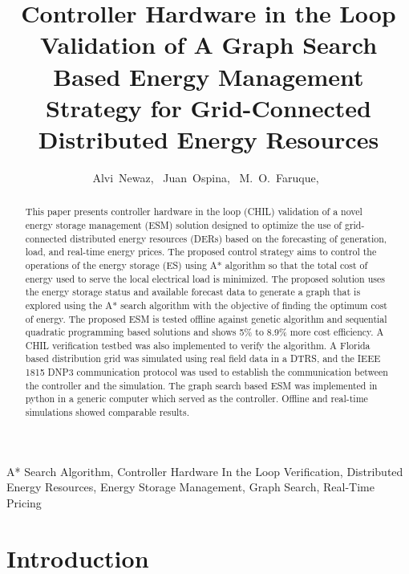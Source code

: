 \documentclass[journal]{IEEEtran}
\begin{document}
\title{Controller Hardware in the Loop Validation of A Graph Search Based Energy Management Strategy for Grid-Connected Distributed Energy Resources}

\author{ Alvi~Newaz,~
Juan~Ospina,~
     M.~O.~Faruque,~
        }%
        
\maketitle
\begin{abstract}
This paper presents controller hardware in the loop (CHIL) validation of a novel energy storage management (ESM) solution designed to optimize the use of grid-connected distributed energy resources (DERs) based on the forecasting of generation, load, and real-time energy prices. The proposed control strategy aims to control the operations of the energy storage (ES) using A* algorithm so that the total cost of energy used to serve the local electrical load is minimized. The proposed solution uses the energy storage status and available forecast data to generate a graph that is explored using the A* search algorithm with the objective of finding the optimum cost of energy. The proposed ESM is tested offline against genetic algorithm and sequential quadratic programming based solutions and shows 5\% to 8.9\% more cost efficiency. A CHIL verification testbed was also implemented to verify the algorithm. A Florida based distribution grid was simulated using real field data in a DTRS, and the IEEE 1815 DNP3 communication protocol was used to establish the communication between the controller and the simulation. The graph search based ESM was implemented in python in a generic computer which served as the controller. Offline and real-time simulations showed comparable results.  
\end{abstract}
                                         
\begin{IEEEkeywords}
A* Search Algorithm, Controller Hardware In the Loop Verification, Distributed Energy Resources, Energy Storage Management, Graph Search, Real-Time Pricing
\end{IEEEkeywords}

\IEEEpeerreviewmaketitle

\section{Introduction}

\end{document}
